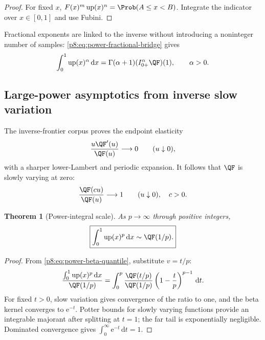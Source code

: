 \documentclass[11pt,oneside]{article}
\newtheorem{theorem}{Theorem}[section]
\theoremstyle{definition}
\theoremstyle{remark}
\newcommand{\Up}{\operatorname{up}}
\newcommand{\dd}{\,\mathrm d}
\newcommand{\e}{\mathrm e}
\newcommand{\1}{\mathbf 1}
\begin{document}
\begin{proof}
For fixed \(x\), \(F(x)^m\Up(x)^n=\Prob(A\le x<B)\).  Integrate the indicator
over \(x\in[0,1]\) and use Fubini.
\end{proof}

Fractional exponents are linked to the inverse without introducing a
noninteger number of samples: \eqref{p8:eq:power-fractional-bridge} gives
\begin{equation}
 \int_0^1\Up(x)^\alpha\dd x
 =\Gamma(\alpha+1)(I_{0+}^{\alpha}\QF)(1),
 \qquad \alpha>0.
 \label{p8:eq:power-alpha-Q}
\end{equation}

\subsection{Large-power asymptotics from inverse slow variation}

The inverse-frontier corpus proves the endpoint elasticity
\cite{p8:proveitInverse}
\begin{equation}
 \frac{u\QF'(u)}{\QF(u)}\longrightarrow0
 \qquad(u\downarrow0),
 \label{p8:eq:Q-elasticity-zero}
\end{equation}
with a sharper lower-Lambert and periodic expansion.  It follows that \(\QF\)
is slowly varying at zero:
\begin{equation}
 \frac{\QF(cu)}{\QF(u)}\longrightarrow1
 \qquad(u\downarrow0),\quad c>0.
 \label{p8:eq:Q-slow-variation}
\end{equation}

\begin{theorem}[Power-integral scale]
\label{p8:thm:power-asymptotic}
As \(p\to\infty\) through positive integers,
\begin{equation}
 \boxed{
 \int_0^1\Up(x)^p\dd x\sim\QF(1/p).}
 \label{p8:eq:power-asymptotic}
\end{equation}
\statusprovedPartll
\end{theorem}

\begin{proof}
From \eqref{p8:eq:power-beta-quantile}, substitute \(v=t/p\):
\[
 \frac{\int_0^1\Up(x)^p\dd x}{\QF(1/p)}
 =\int_0^p
 \frac{\QF(t/p)}{\QF(1/p)}
 \left(1-\frac tp\right)^{p-1}\dd t.
\]
For fixed \(t>0\), slow variation gives convergence of the ratio to one, and
the beta kernel converges to \(\e^{-t}\).  Potter bounds for slowly varying
functions provide an integrable majorant after splitting at \(t=1\); the
far tail is exponentially negligible.  Dominated convergence gives
\(\int_0^\infty\e^{-t}\dd t=1\).
\end{proof}
\end{document}

